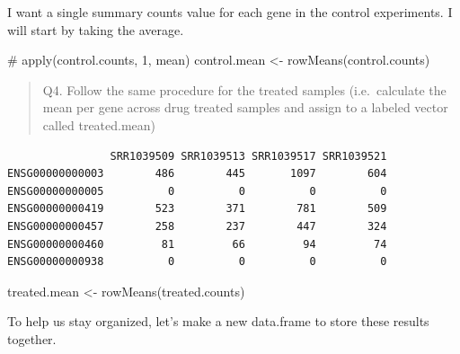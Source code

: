 \documentclass[
  letterpaper,
  DIV=11,
  numbers=noendperiod]{scrartcl}
\newenvironment{Shaded}{\begin{snugshade}}{\end{snugshade}}
\newcommand{\CommentTok}[1]{\textcolor[rgb]{0.37,0.37,0.37}{#1}}
\newcommand{\FunctionTok}[1]{\textcolor[rgb]{0.28,0.35,0.67}{#1}}
\newcommand{\NormalTok}[1]{\textcolor[rgb]{0.00,0.23,0.31}{#1}}
\newcommand{\OtherTok}[1]{\textcolor[rgb]{0.00,0.23,0.31}{#1}}
\newcommand{\SpecialCharTok}[1]{\textcolor[rgb]{0.37,0.37,0.37}{#1}}
\newcommand{\StringTok}[1]{\textcolor[rgb]{0.13,0.47,0.30}{#1}}
\begin{document}
I want a single summary counts value for each gene in the control
experiments. I will start by taking the average.

\begin{Shaded}
\begin{Highlighting}[]
\CommentTok{\# apply(control.counts, 1, mean)}
\NormalTok{control.mean }\OtherTok{\textless{}{-}} \FunctionTok{rowMeans}\NormalTok{(control.counts)}
\end{Highlighting}
\end{Shaded}

\begin{quote}
Q4. Follow the same procedure for the treated samples (i.e.~calculate
the mean per gene across drug treated samples and assign to a labeled
vector called treated.mean)
\end{quote}

\begin{Shaded}
\end{Shaded}

\begin{verbatim}
                SRR1039509 SRR1039513 SRR1039517 SRR1039521
ENSG00000000003        486        445       1097        604
ENSG00000000005          0          0          0          0
ENSG00000000419        523        371        781        509
ENSG00000000457        258        237        447        324
ENSG00000000460         81         66         94         74
ENSG00000000938          0          0          0          0
\end{verbatim}

\begin{Shaded}
\begin{Highlighting}[]
\NormalTok{treated.mean }\OtherTok{\textless{}{-}} \FunctionTok{rowMeans}\NormalTok{(treated.counts)}
\end{Highlighting}
\end{Shaded}

To help us stay organized, let's make a new data.frame to store these
results together.
\end{document}
